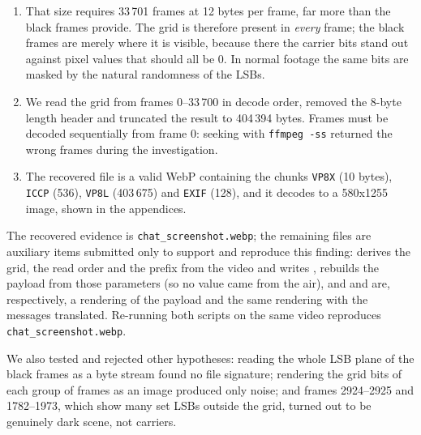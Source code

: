 \documentclass[11pt,a4paper,final,oneside]{article}
\begin{document}
\begin{itemize}
\begin{enumerate}
    \item That size requires 33\,701 frames at 12 bytes per frame, far more than the black frames provide. The grid is therefore present in \emph{every} frame; the black frames are merely where it is visible, because there the carrier bits stand out against pixel values that should all be 0. In normal footage the same bits are masked by the natural randomness of the LSBs.
    \item We read the grid from frames 0--33\,700 in decode order, removed the 8-byte length header and truncated the result to 404\,394 bytes. Frames must be decoded sequentially from frame 0: seeking with \texttt{ffmpeg -ss} returned the wrong frames during the investigation.
    \item The recovered file is a valid WebP containing the chunks \texttt{VP8X} (10 bytes), \texttt{ICCP} (536), \texttt{VP8L} (403\,675) and \texttt{EXIF} (128), and it decodes to a 580x1255 image, shown in the appendices.
  \end{enumerate}

  The recovered evidence is \texttt{chat\_screenshot.webp}; the remaining files are auxiliary items submitted only to support and reproduce this finding:  derives the grid, the read order and the prefix from the video and writes ,  rebuilds the payload from those parameters (so no value came from the air), and  and  are, respectively, a rendering of the payload and the same rendering with the messages translated. Re-running both scripts on the same video reproduces \texttt{chat\_screenshot.webp}.

  We also tested and rejected other hypotheses: reading the whole LSB plane of the black frames as a byte stream found no file signature; rendering the grid bits of each group of frames as an image produced only noise; and frames 2924--2925 and 1782--1973, which show many set LSBs outside the grid, turned out to be genuinely dark scene, not carriers.


\end{itemize}
\end{document}
